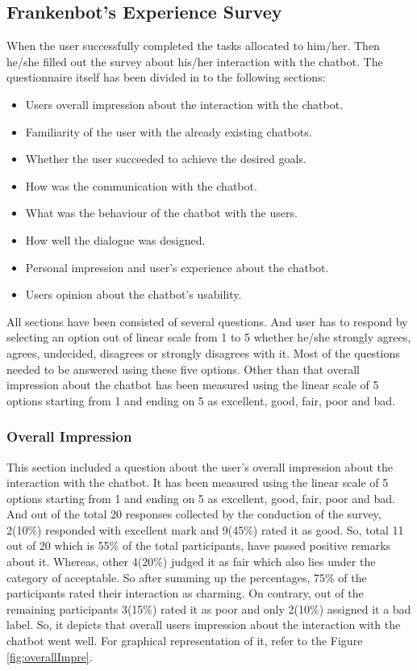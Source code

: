 \subsection{Frankenbot's Experience Survey}
When the user successfully completed the tasks allocated to him/her. Then he/she filled out the survey about his/her interaction with the chatbot. The questionnaire itself has been divided in to the following sections:
\begin{itemize}
    \item Users overall impression about the interaction with the chatbot.
    \item Familiarity of the user with the already existing chatbots.
    \item Whether the user succeeded to achieve the desired goals.
    \item How was the communication with the chatbot.
    \item What was the behaviour of the chatbot with the users.
    \item How well the dialogue was designed.
    \item Personal impression and user's experience about the chatbot.
    \item Users opinion about the chatbot's usability. 
\end{itemize} 
All sections have been consisted of several questions. And user has to respond by selecting an option out of linear scale from 1 to 5 whether he/she strongly agrees, agrees, undecided, disagrees or strongly disagrees with it. Most of the questions needed to be answered using these five options. Other than that overall impression about the chatbot has been measured using the linear scale of 5 options starting from 1 and ending on 5 as excellent, good, fair, poor and bad.

\subsubsection*{Overall Impression}
This section included a question about the user's overall impression about the interaction with the chatbot. It has been measured using the linear scale of 5 options starting from 1 and ending on 5 as excellent, good, fair, poor and bad. And out of the total 20 responses collected by the conduction of the survey, 2(10\%) responded with excellent mark and 9(45\%) rated it as good. So, total 11 out of 20 which is 55\% of the total participants, have passed positive remarks about it. Whereas, other 4(20\%) judged it as fair which also lies under the category of acceptable. So after summing up the percentages, 75\% of the participants rated their interaction as charming. On contrary, out of the remaining participants 3(15\%) rated it as poor and only 2(10\%) assigned it a bad label. So, it depicts that overall users impression about the interaction with the chatbot went well. For graphical representation of it, refer to the Figure \ref{fig:overallImpre}.

